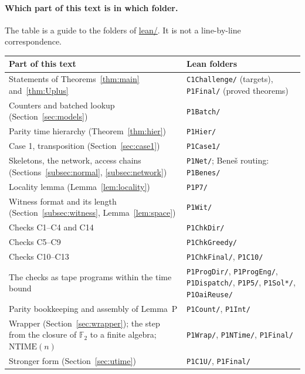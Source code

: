 \documentclass[11pt]{article}
\theoremstyle{definition}
\theoremstyle{remark}
\newcommand{\F}{\mathbb F}
\newcommand{\NTIME}{\mathrm{NTIME}}
\newcommand{\src}[1]{\url{#1}}
\begin{document}
\paragraph{Which part of this text is in which folder.} The table is a guide to the folders of \src{lean/}. It is not a
line-by-line correspondence.
\begin{center}
\begin{tabular}{p{}p{}}
\hline
Part of this text & Lean folders \\
\hline
Statements of Theorems~\ref{thm:main} and~\ref{thm:Uplus} & \texttt{C1Challenge/} (targets), \texttt{P1Final/} (proved theorems) \\
Counters and batched lookup (Section~\ref{sec:models}) & \texttt{P1Batch/} \\
Parity time hierarchy (Theorem~\ref{thm:hier}) & \texttt{P1Hier/} \\
Case 1, transposition (Section~\ref{sec:case1}) & \texttt{P1Case1/} \\
Skeletons, the network, access chains (Sections~\ref{subsec:normal}, \ref{subsec:network}) & \texttt{P1Net/}; Bene\v{s} routing: \texttt{P1Benes/} \\
Locality lemma (Lemma~\ref{lem:locality}) & \texttt{P1P7/} \\
Witness format and its length (Section~\ref{subsec:witness}, Lemma~\ref{lem:space}) & \texttt{P1Wit/} \\
Checks C1--C4 and C14 & \texttt{P1ChkDir/} \\
Checks C5--C9 & \texttt{P1ChkGreedy/} \\
Checks C10--C13 & \texttt{P1ChkFinal/}, \texttt{P1C10/} \\
The checks as tape programs within the time bound & \texttt{P1ProgDir/}, \texttt{P1ProgEng/}, \texttt{P1Dispatch/}, \texttt{P1P5/}, \texttt{P1Sol*/}, \texttt{P1OaiReuse/} \\
Parity bookkeeping and assembly of Lemma~P & \texttt{P1Count/}, \texttt{P1Int/} \\
Wrapper (Section~\ref{sec:wrapper}); the step from the closure of $\F_2$ to a finite algebra; $\NTIME(n)$ & \texttt{P1Wrap/}, \texttt{P1NTime/}, \texttt{P1Final/} \\
Stronger form (Section~\ref{sec:utime}) & \texttt{P1C1U/}, \texttt{P1Final/} \\
\hline
\end{tabular}
\end{center}
\end{document}
